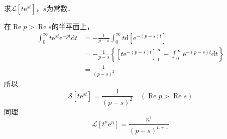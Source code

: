 \begin{example}{}
求$\mathscr L[t\mathrm e^{st}]$，$s$为常数．

在$\operatorname{Re} p>\operatorname{Re} s$的半平面上，
\begin{equation}
\begin{aligned} \int_{0}^{\infty} t \mathrm{e}^{s t} \mathrm{e}^{-p t} \mathrm{d} t &=-\frac{1}{p-s} \int_{0}^{\infty} t \mathrm{d}\left[\mathrm{e}^{-(p-s) t}\right] \\ &=-\frac{1}{p-s}\left\{\left[t \mathrm{e}^{-(p-s) t}\right]_{0}^{\infty}-\int_{0}^{\infty} \mathrm{e}^{-(p-s) t} \mathrm{d} t\right\} \\ &=\frac{1}{(p-s)^{2}} \end{aligned}
\end{equation}
所以
\begin{equation}
\mathscr{S}\left[t \mathrm{e}^{s t}\right]=\frac{1}{(p-s)^{2}} \quad(\operatorname{Re} p>\operatorname{Re} s)
\end{equation}
同理
\begin{equation}
\mathscr{L}\left[t^{n} \mathrm{e}^{n}\right]=\frac{n !}{(p-s)^{n+1}}
\end{equation}
\end{example}
